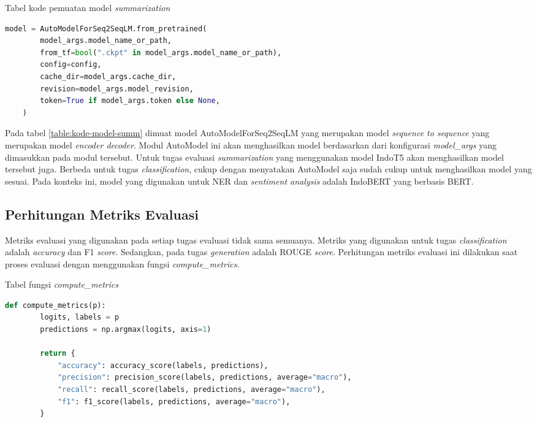 \begin{table}[h]
    \caption{Tabel kode pemuatan model \textit{summarization}}
    \label{table:kode-model-summ}
    \begin{lstlisting}[language=python]
    model = AutoModelForSeq2SeqLM.from_pretrained(
        model_args.model_name_or_path,
        from_tf=bool(".ckpt" in model_args.model_name_or_path),
        config=config,
        cache_dir=model_args.cache_dir,
        revision=model_args.model_revision,
        token=True if model_args.token else None,
    )
    \end{lstlisting}
\end{table}

Pada tabel \ref{table:kode-model-summ} dimuat model AutoModelForSeq2SeqLM yang merupakan model \textit{sequence to sequence} yang merupakan model \textit{encoder decoder}. Modul AutoModel ini akan menghasilkan model berdasarkan dari konfigurasi \textit{model\_args} yang dimasukkan pada modul tersebut. Untuk tugas evaluasi \textit{summarization} yang menggunakan model IndoT5 akan menghasilkan model tersebut juga. Berbeda untuk tugas \textit{classification}, cukup dengan menyatakan AutoModel saja sudah cukup untuk menghasilkan model yang sesuai. Pada konteks ini, model yang digunakan untuk NER dan \textit{sentiment analysis} adalah IndoBERT yang berbasis BERT.

\subsection{Perhitungan Metriks Evaluasi}
\label{sec:metriks-evaluasi}

Metriks evaluasi yang digunakan pada setiap tugas evaluasi tidak sama semuanya. Metriks yang digunakan untuk tugas \textit{classification} adalah \textit{accuracy} dan F1 \textit{score}. Sedangkan, pada tugas \textit{generation} adalah ROUGE \textit{score}. Perhitungan metriks evaluasi ini dilakukan saat proses evaluasi dengan menggunakan fungsi \textit{compute\_metrics}.

\begin{table}[h]
    \caption{Tabel fungsi \textit{compute\_metrics}}
    \label{table:compute-metrics}
    \begin{lstlisting}[language=python]
    def compute_metrics(p):
        logits, labels = p
        predictions = np.argmax(logits, axis=1)

        return {
            "accuracy": accuracy_score(labels, predictions),
            "precision": precision_score(labels, predictions, average="macro"),
            "recall": recall_score(labels, predictions, average="macro"),
            "f1": f1_score(labels, predictions, average="macro"),
        }
    \end{lstlisting}
\end{table}

